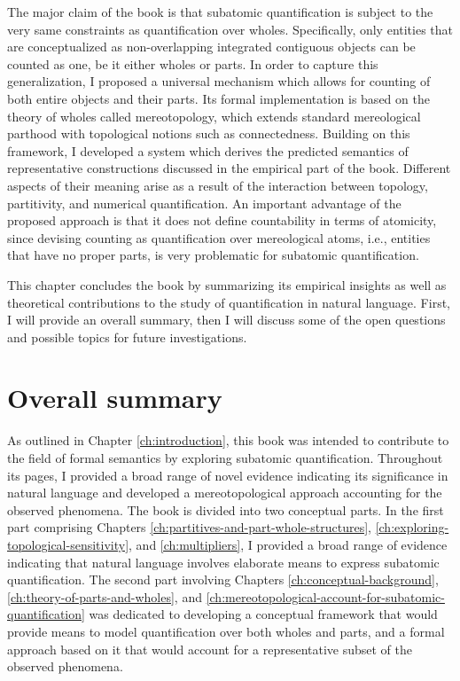 The major claim of the book is that subatomic quantification is subject to the very same constraints as quantification over wholes. Specifically, only entities that are conceptualized as non-overlapping integrated contiguous objects can be counted as one, be it either wholes or parts. In order to capture this generalization, I proposed a universal mechanism which allows for counting of both entire objects and their parts. Its formal implementation is based on the theory of wholes called mereotopology, which extends standard mereological parthood with topological notions such as connectedness. Building on this framework, I developed a system which derives the predicted semantics of representative constructions discussed in the empirical part of the book. Different aspects of their meaning arise as a result of the interaction between topology, partitivity, and numerical quantification. An important advantage of the proposed approach is that it does not define countability in terms of atomicity, since devising counting as quantification over mereological atoms, i.e., entities that have no proper parts, is very problematic for subatomic quantification.

This chapter concludes the book by summarizing its empirical insights as well as theoretical contributions to the study of quantification in natural language. First, I will provide an overall summary, then I will discuss some of the open questions and possible topics for future investigations.

\section{Overall summary}\label{sec:overall-summary}

As outlined in Chapter \ref{ch:introduction}, this book was intended to contribute to the field of formal semantics by exploring subatomic quantification. Throughout its pages, I provided a broad range of novel evidence indicating its significance in natural language and developed a mereotopological approach accounting for the observed phenomena. The book is divided into two conceptual parts. In the first part comprising Chapters \ref{ch:partitives-and-part-whole-structures}, \ref{ch:exploring-topological-sensitivity}, and \ref{ch:multipliers}, I provided a broad range of evidence indicating that natural language involves elaborate means to express subatomic quantification. The second part involving Chapters \ref{ch:conceptual-background}, \ref{ch:theory-of-parts-and-wholes}, and \ref{ch:mereotopological-account-for-subatomic-quantification} was dedicated to developing a conceptual framework that would provide means to model quantification over both wholes and parts, and a formal approach based on it that would account for a representative subset of the observed phenomena.

